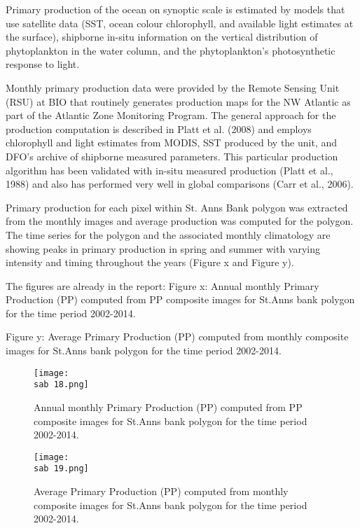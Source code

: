 \documentclass[letterpaper,portrait,11pt]{scrartcl}
\numberwithin{equation}{section}		%
\numberwithin{figure}{section}			%
\numberwithin{table}{section}				%
\newcommand{\ecomod}{\string~/ecomod_data/}   %
\newcommand{\sab}{\ecomod/mpa/sab/}   %
\begin{document}
Primary production of the ocean on synoptic scale is estimated by models that use satellite data (SST, ocean colour chlorophyll, and available light estimates at the surface), shipborne in-situ information on the vertical distribution of phytoplankton in the water column, and the phytoplankton’s photosynthetic response to light.

Monthly primary production data were provided by the Remote Sensing Unit (RSU) at BIO that routinely generates production maps for the NW Atlantic as part of the Atlantic Zone Monitoring Program. The general approach for the production computation is described in Platt et al. (2008) and employs chlorophyll and light estimates from MODIS, SST produced by the unit, and DFO’s archive of shipborne measured parameters. This particular production algorithm has been validated with in-situ measured production (Platt et al., 1988) and also has performed very well in global comparisons (Carr et al., 2006).

Primary production for each pixel within St. Anns Bank polygon was extracted from the monthly images and average production was computed for the polygon. The time series for the polygon and the associated monthly climatology are showing peaks in primary production in spring and summer with varying intensity and timing throughout the years (Figure x and Figure y). 



The figures are already in the report:
Figure x: Annual monthly Primary Production (PP) computed from PP composite images for St.Anns bank polygon for the time period 2002-2014.

Figure y: Average Primary Production (PP) computed from monthly composite images for St.Anns bank polygon for the time period 2002-2014.





\begin{figure}[h]
  \centering
  \texttt{[image: \\sab 18.png]}
  \caption{Annual monthly Primary Production (PP) computed from PP composite images for St.Anns bank polygon for the time period 2002-2014.}
\label{Figure x: }
\end{figure}


\begin{figure}[h]
  \centering
  \texttt{[image: \\sab 19.png]}
  \caption{Average Primary Production (PP) computed from monthly composite images for St.Anns bank polygon for the time period 2002-2014.}
  \label{Figure x: }
\end{figure}
\end{document}
